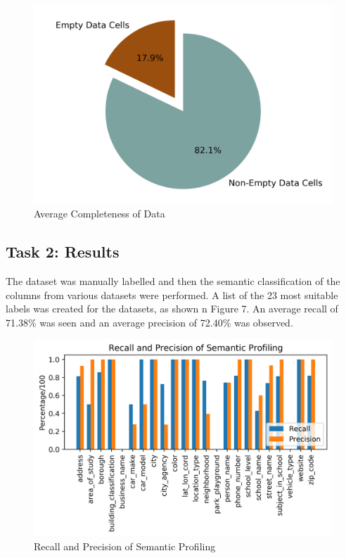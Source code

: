 \documentclass[sigconf,authordraft]{acmart}
\begin{document}
\begin{figure}[h]
  \centering
  \includegraphics[width=\linewidth]{avg_completeness_no_title.png}
  \caption{Average Completeness of Data}
\end{figure}



\subsection{Task 2: Results}

The dataset was manually labelled and then the semantic classification of the columns from various datasets were performed. A list of the 23 most suitable labels was created for the datasets, as shown n Figure 7. An average recall of 71.38\% was seen and an average precision of 72.40\% was observed.
\begin{figure}[H]
  \centering
  \includegraphics[width=\linewidth]{precision_recall.png}
  \caption{Recall and Precision of Semantic Profiling}
\end{figure}
\end{document}
